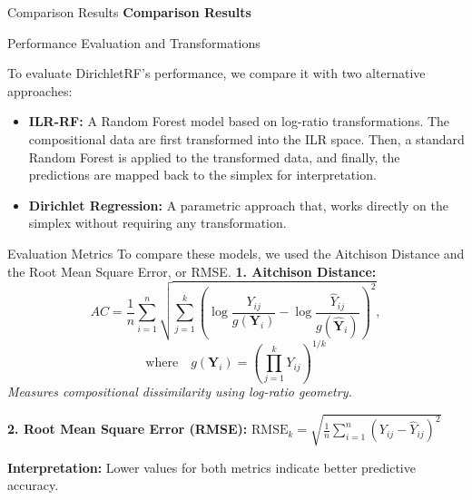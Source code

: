 \begin{frame}{Comparison Results}
      \centering
      \vfill
      \textbf{\Large Comparison Results}
      \vfill
\end{frame}

\begin{frame}{Performance Evaluation and Transformations}

To evaluate DirichletRF's performance, we compare it with two alternative approaches:
\begin{itemize}
    \item[1)] \textbf{ILR-RF:} A Random Forest model based on log-ratio transformations. 
    The compositional data are first transformed into the ILR
    space. Then, a standard Random Forest is applied to the transformed data, and 
    finally, the predictions are mapped back to the simplex for interpretation.

    \item[2)] \textbf{Dirichlet Regression:} A parametric approach that, 
    works directly on the simplex without requiring any transformation.
\end{itemize}

\end{frame}




\begin{frame}{Evaluation Metrics}
To compare these models, we used  the Aitchison Distance and the Root Mean Square Error, or RMSE.
\vspace{0.2cm}
\textbf{1. Aitchison Distance:}
\[
AC = \frac{1}{n} \sum_{i=1}^n \sqrt{\sum_{j=1}^k \left(\log\frac{Y_{ij}}{g(\mathbf{Y}_i)} - \log\frac{\hat{Y}_{ij}}{g(\hat{\mathbf{Y}}_i)}\right)^2},
\]
\[
\text{where} \quad g(\mathbf{Y}_i) = \left(\prod_{j=1}^k Y_{ij}\right)^{1/k}
\]
\textit{Measures compositional dissimilarity using log-ratio geometry.}

\vspace{0.3cm}
\textbf{2. Root Mean Square Error (RMSE):}
$
\text{RMSE}_k =  \sqrt{\frac{1}{n} \sum_{i=1}^n (Y_{ij} - \hat{Y}_{ij})^2}
$

\vspace{0.3cm}
\textbf{Interpretation:} Lower values for both metrics indicate better predictive accuracy.
\end{frame}








